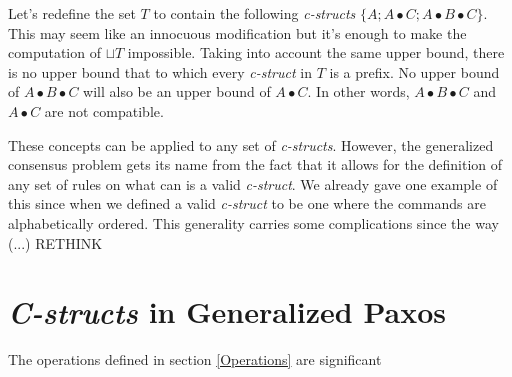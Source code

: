Let's redefine the set $T$ to contain the following \textit{c-structs} $\{A ; A \bullet C ; A \bullet B \bullet C\}$. This may seem like an innocuous modification but it's enough to make the computation of $\sqcup T$ impossible. Taking into account the same upper bound, there is no upper bound that to which every \textit{c-struct} in $T$ is a prefix. No upper bound of $A \bullet B \bullet C$ will also be an upper bound of $A \bullet C$. In other words, $A \bullet B \bullet C$ and $A \bullet C$ are not compatible.\par 
These concepts can be applied to any set of \textit{c-structs}. However, the generalized consensus problem gets its name from the fact that it allows for the definition of any set of rules on what can is a valid \textit{c-struct}. We already gave one example of this since when we defined a valid \textit{c-struct} to be one where the commands are alphabetically ordered. {\color{red} This generality carries some complications since the way (...) RETHINK}

\section{\textit{C-structs} in Generalized Paxos}
The operations defined in section \ref{Operations} are significant 

